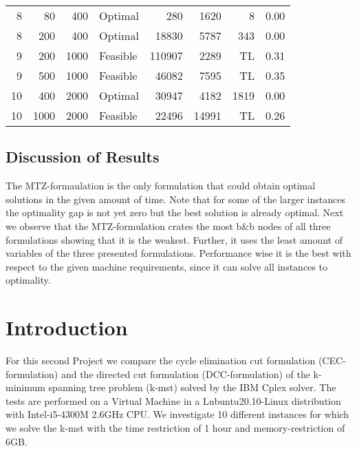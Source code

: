 \documentclass[11pt]{article}
\begin{document}
\begin{tabular}{rrrlrrrr}
        8 &    80 &          400 &         Optimal &        280 &      1620 &             8 &                0.00 \\
        8 &   200 &          400 &         Optimal &      18830 &      5787 &           343 &                0.00 \\
        9 &   200 &         1000 &        Feasible &     110907 &      2289 &          TL &                0.31 \\
        9 &   500 &         1000 &        Feasible &      46082 &      7595 &          TL &                0.35 \\
       10 &   400 &         2000 &         Optimal &      30947 &      4182 &          1819 &                0.00 \\
       10 &  1000 &         2000 &        Feasible &      22496 &     14991 &          TL &                0.26 \\
\bottomrule
\end{tabular}
\subsection{Discussion of Results}
The MTZ-formaulation is the only formulation that could obtain optimal solutions in the given amount of time. Note that for some of the larger instances the optimality gap is not yet zero but the best solution is already optimal. Next we observe that the MTZ-formulation crates the most b\&b nodes of all three formulations showing that it is the weakest. Further, it uses the least amount of variables of the three presented formulations. Performance wise it is the best with respect to the given machine requirements, since it can solve all instances to optimality.

\section{Introduction}
For this second Project we compare the cycle elimination cut formulation (CEC-formulation) and the directed cut formulation (DCC-formulation) of the k-minimum spanning tree problem (k-mst) solved by the IBM Cplex solver. The tests are performed on a Virtual Machine in a Lubuntu20.10-Linux distribution with Intel-i5-4300M 2.6GHz CPU. We investigate 10 different instances for which we solve the k-mst with the time restriction of 1 hour and memory-restriction of 6GB.
\end{document}
